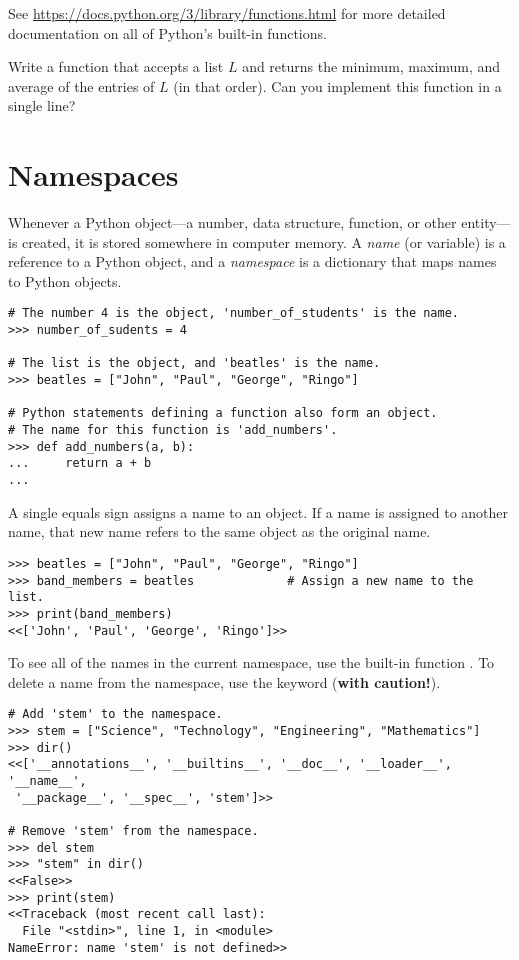 See \url{https://docs.python.org/3/library/functions.html} for more detailed documentation on all of Python's built-in functions.

\begin{problem} %
Write a function that accepts a list $L$ and returns the minimum, maximum, and average of the entries of $L$ (in that order).
Can you implement this function in a single line?
\end{problem}

\section*{Namespaces} %

Whenever a Python object---a number, data structure, function, or other entity---is created, it is stored somewhere in computer memory.
A \emph{name} (or variable) is a reference to a Python object, and a \emph{namespace} is a dictionary that maps names to Python objects.

\begin{lstlisting}
# The number 4 is the object, 'number_of_students' is the name.
>>> number_of_sudents = 4

# The list is the object, and 'beatles' is the name.
>>> beatles = ["John", "Paul", "George", "Ringo"]

# Python statements defining a function also form an object.
# The name for this function is 'add_numbers'.
>>> def add_numbers(a, b):
...     return a + b
...
\end{lstlisting}

A single equals sign assigns a name to an object.
If a name is assigned to another name, that new name refers to the same object as the original name.

\begin{lstlisting}
>>> beatles = ["John", "Paul", "George", "Ringo"]
>>> band_members = beatles             # Assign a new name to the list.
>>> print(band_members)
<<['John', 'Paul', 'George', 'Ringo']>>
\end{lstlisting}

To see all of the names in the current namespace, use the built-in function .
To delete a name from the namespace, use the  keyword (\textbf{with caution!}).

\begin{lstlisting}
# Add 'stem' to the namespace.
>>> stem = ["Science", "Technology", "Engineering", "Mathematics"]
>>> dir()
<<['__annotations__', '__builtins__', '__doc__', '__loader__', '__name__',
 '__package__', '__spec__', 'stem']>>

# Remove 'stem' from the namespace.
>>> del stem
>>> "stem" in dir()
<<False>>
>>> print(stem)
<<Traceback (most recent call last):
  File "<stdin>", line 1, in <module>
NameError: name 'stem' is not defined>>
\end{lstlisting}

